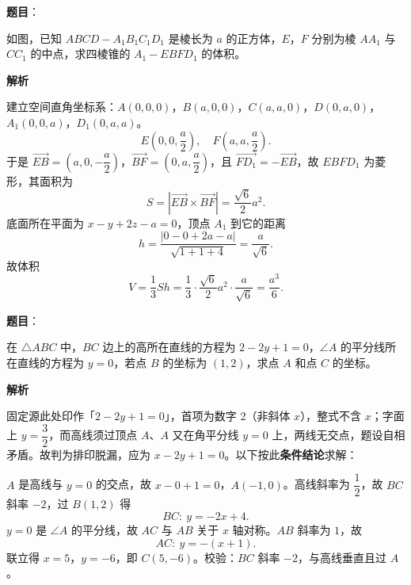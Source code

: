 \begin{answer}

\textbf{题目}：

如图，已知 \(ABCD-A_1B_1C_1D_1\) 是棱长为 \(a\) 的正方体，\(E\)，\(F\) 分别为棱 \(AA_1\) 与 \(CC_1\) 的中点，求四棱锥的 \(A_1-EBFD_1\) 的体积。
\nopagebreak[4]
\begin{center}\end{center}
\nopagebreak[4]

\textbf{解析}

建立空间直角坐标系：\(A(0,0,0)\)，\(B(a,0,0)\)，\(C(a,a,0)\)，\(D(0,a,0)\)，\(A_1(0,0,a)\)，\(D_1(0,a,a)\)。
\nopagebreak[4]
\[
E\left(0,0,\frac a2\right),\quad F\left(a,a,\frac a2\right).
\]
于是 \(\overrightarrow{EB}=\left(a,0,-\dfrac a2\right)\)，\(\overrightarrow{BF}=\left(0,a,\dfrac a2\right)\)，且 \(\overrightarrow{FD_1}=-\overrightarrow{EB}\)，故 \(EBFD_1\) 为菱形，其\mbox{面积}为
\nopagebreak[4]
\[
S=\left|\overrightarrow{EB}\times\overrightarrow{BF}\right|
=\frac{\sqrt6}{2}a^2.
\]
底面所在平面为 \(x-y+2z-a=0\)，顶点 \(A_1\) 到它的距离
\nopagebreak[4]
\[
h=\frac{|0-0+2a-a|}{\sqrt{1+1+4}}=\frac{a}{\sqrt6}.
\]
故体积
\nopagebreak[4]
\[
V=\frac13Sh=\frac13\cdot\frac{\sqrt6}{2}a^2\cdot\frac{a}{\sqrt6}=\frac{a^3}{6}.
\]


\end{answer}
\begin{answer}

\textbf{题目}：

在 \(\triangle ABC\) 中，\(BC\) 边上的高所在直线的方程为 \(2-2y+1=0\)，\(\angle A\) 的平分线所在直线的方程为 \(y=0\)，若点 \(B\) 的坐标为 \((1,2)\)，求点 \(A\) 和点 \(C\) 的坐标。

\textbf{解析}

固定源此处印作「\(2-2y+1=0\)」，首项为数字 2（非斜体 \(x\)），整式不含 \(x\)；字面上 \(y=\dfrac32\)，而高线须过顶点 \(A\)、\(A\) 又在角平分线 \(y=0\) 上，两线无交点，题设自相矛盾。故判为排印脱漏，应为 \(x-2y+1=0\)。以下按此\textbf{条件结论}求解：

\(A\) 是高线与 \(y=0\) 的交点，故 \(x-0+1=0\)，\(A(-1,0)\)。高线斜率为 \(\dfrac12\)，故 \(BC\) 斜率 \(-2\)，过 \(B(1,2)\) 得
\nopagebreak[4]
\[
BC:\ y=-2x+4.
\]
\(y=0\) 是 \(\angle A\) 的平分线，故 \(AC\) 与 \(AB\) 关于 \(x\) 轴对称。\(AB\) 斜率为 \(1\)，故
\nopagebreak[4]
\[
AC:\ y=-(x+1).
\]
联立得 \(x=5\)，\(y=-6\)，即 \(C(5,-6)\)。校验：\(BC\) 斜率 \(-2\)，与高线垂直且过 \(A\)。


\end{answer}
